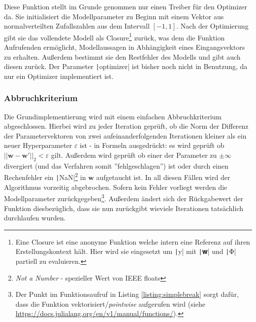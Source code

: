 \documentclass{article}
\theoremstyle{plain} %
\theoremstyle{definition} %
\begin{document}
Diese Funktion stellt im Grunde genommen nur einen Treiber für den Optimizer da. Sie initialisiert die Modellparameter zu Beginn mit einem Vektor aus normalverteilten Zufallszahlen\cite{Lippe} aus dem Intervall $[-1, 1]$. Nach der Optimierung gibt sie das vollendete Modell als Closure\footnote{Eine Closure ist eine anonyme Funktion welche intern eine Referenz auf ihren Erstellungskontext hält. Hier wird sie eingesetzt um \texttt|y| mit \texttt|𝐰| und \texttt|Φ| partiell zu evaluieren.} zurück, was dem die Funktion Aufrufenden ermöglicht, Modellaussagen in Abhängigkeit eines Eingangsvektors zu erhalten. Außerdem bestimmt sie den Restfehler des Modells und gibt auch diesen zurück. Der Parameter \texttt|optimizer| ist bisher noch nicht in Benutzung, da nur ein Optimizer implementiert ist.

\subsubsection{Abbruchkriterium}

Die Grundimplementierung wird mit einem einfachen Abbruchkriterium abgeschlossen. Hierbei wird zu jeder Iteration geprüft, ob die Norm der Differenz der Parametervektoren von zwei aufeinanderfolgenden Iterationen kleiner als ein neuer Hyperparameter $\varepsilon$ ist - in Formeln ausgedrückt: es wird geprüft ob $||\mathbf{w} - \mathbf{w}'||_2 < \varepsilon$ gilt.
Außerdem wird geprüft ob einer der Parameter zu $\pm\infty$ divergiert (und das Verfahren somit ''fehlgeschlagen'') ist oder durch einen Rechenfehler ein \texttt|NaN|\footnote{\emph{Not a Number} - spezieller Wert von IEEE floats} in $\mathbf{w}$ aufgetaucht ist. In all diesen Fällen wird der Algorithmus vorzeitig abgebrochen. Sofern kein Fehler vorliegt werden die Modellparameter zurückgegeben\footnote{Der Punkt im Funktionsaufruf in Listing \ref{listing:simplebreak} sorgt dafür, dass die Funktion vektorisiert/\emph{pointwise} aufgerufen wird (siehe \url{https://docs.julialang.org/en/v1/manual/functions/}).}. Außerdem ändert sich der Rückgabewert der Funktion diesbezüglich, dass sie nun zurückgibt wieviele Iterationen tatsächlich durchlaufen wurden.
\end{document}
